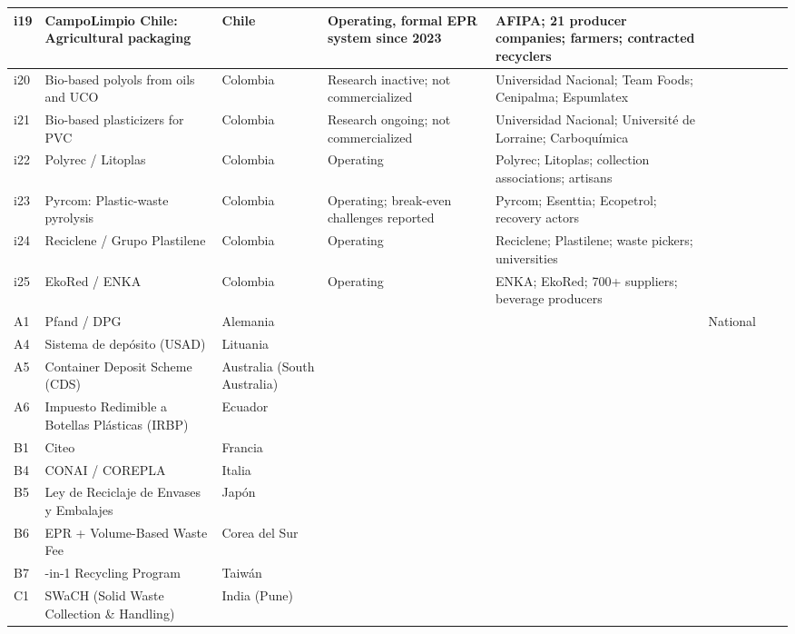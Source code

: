 \documentclass[
  12pt,
  oneside]{book}
\begin{document}
\begin{table}
{\begin{tabular}[t]{>{\raggedright\arraybackslash}p{2cm}>{\raggedright\arraybackslash}p{4cm}>{\raggedright\arraybackslash}p{4cm}>{\raggedright\arraybackslash}p{4cm}llll}
\midrule\addlinespace
i19 & CampoLimpio Chile: Agricultural packaging & Chile & Operating, formal EPR system since 2023 & AFIPA; 21 producer companies; farmers; contracted recyclers &  &  & \\
\midrule\addlinespace
i20 & Bio-based polyols from oils and UCO & Colombia & Research inactive; not commercialized & Universidad Nacional; Team Foods; Cenipalma; Espumlatex &  &  & \\
\midrule\addlinespace
i21 & Bio-based plasticizers for PVC & Colombia & Research ongoing; not commercialized & Universidad Nacional; Université de Lorraine; Carboquímica &  &  & \\
\midrule\addlinespace
i22 & Polyrec / Litoplas & Colombia & Operating & Polyrec; Litoplas; collection associations; artisans &  &  & \\
\midrule\addlinespace
i23 & Pyrcom: Plastic-waste pyrolysis & Colombia & Operating; break-even challenges reported & Pyrcom; Esenttia; Ecopetrol; recovery actors &  &  & \\
\midrule\addlinespace
i24 & Reciclene / Grupo Plastilene & Colombia & Operating & Reciclene; Plastilene; waste pickers; universities &  &  & \\
\midrule\addlinespace
i25 & EkoRed / ENKA & Colombia & Operating & ENKA; EkoRed; 700+ suppliers; beverage producers &  &  & \\
\midrule\addlinespace
A1 & Pfand / DPG & Alemania &  &  & National &  & \\
\midrule\addlinespace
A4 & Sistema de depósito (USAD) & Lituania &  &  &  &  & \\
\midrule\addlinespace
A5 & Container Deposit Scheme (CDS) & Australia (South Australia) &  &  &  &  & \\
\midrule\addlinespace
A6 & Impuesto Redimible a Botellas Plásticas (IRBP) & Ecuador &  &  &  &  & \\
\midrule\addlinespace
B1 & Citeo & Francia &  &  &  &  & \\
\midrule\addlinespace
B4 & CONAI / COREPLA & Italia &  &  &  &  & \\
\midrule\addlinespace
B5 & Ley de Reciclaje de Envases y Embalajes & Japón &  &  &  &  & \\
\midrule\addlinespace
B6 & EPR + Volume-Based Waste Fee & Corea del Sur &  &  &  &  & \\
\midrule\addlinespace
B7 & 4-in-1 Recycling Program & Taiwán &  &  &  &  & \\
\midrule\addlinespace
C1 & SWaCH (Solid Waste Collection \& Handling) & India (Pune) &  &  &  &  & \\

\end{tabular}}
\end{table}
\end{document}
